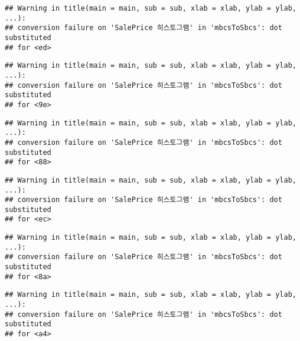 \documentclass[
]{article}
\newenvironment{Shaded}{\begin{snugshade}}{\end{snugshade}}
\newcommand{\AttributeTok}[1]{\textcolor[rgb]{0.77,0.63,0.00}{#1}}
\newcommand{\CommentTok}[1]{\textcolor[rgb]{0.56,0.35,0.01}{\textit{#1}}}
\newcommand{\DecValTok}[1]{\textcolor[rgb]{0.00,0.00,0.81}{#1}}
\newcommand{\FunctionTok}[1]{\textcolor[rgb]{0.00,0.00,0.00}{#1}}
\newcommand{\NormalTok}[1]{#1}
\newcommand{\SpecialCharTok}[1]{\textcolor[rgb]{0.00,0.00,0.00}{#1}}
\newcommand{\StringTok}[1]{\textcolor[rgb]{0.31,0.60,0.02}{#1}}
\begin{document}
\begin{Shaded}
\end{Shaded}

\begin{verbatim}
## Warning in title(main = main, sub = sub, xlab = xlab, ylab = ylab, ...):
## conversion failure on 'SalePrice 히스토그램' in 'mbcsToSbcs': dot substituted
## for <ed>
\end{verbatim}

\begin{verbatim}
## Warning in title(main = main, sub = sub, xlab = xlab, ylab = ylab, ...):
## conversion failure on 'SalePrice 히스토그램' in 'mbcsToSbcs': dot substituted
## for <9e>
\end{verbatim}

\begin{verbatim}
## Warning in title(main = main, sub = sub, xlab = xlab, ylab = ylab, ...):
## conversion failure on 'SalePrice 히스토그램' in 'mbcsToSbcs': dot substituted
## for <88>
\end{verbatim}

\begin{verbatim}
## Warning in title(main = main, sub = sub, xlab = xlab, ylab = ylab, ...):
## conversion failure on 'SalePrice 히스토그램' in 'mbcsToSbcs': dot substituted
## for <ec>
\end{verbatim}

\begin{verbatim}
## Warning in title(main = main, sub = sub, xlab = xlab, ylab = ylab, ...):
## conversion failure on 'SalePrice 히스토그램' in 'mbcsToSbcs': dot substituted
## for <8a>
\end{verbatim}

\begin{verbatim}
## Warning in title(main = main, sub = sub, xlab = xlab, ylab = ylab, ...):
## conversion failure on 'SalePrice 히스토그램' in 'mbcsToSbcs': dot substituted
## for <a4>
\end{verbatim}
\end{document}
